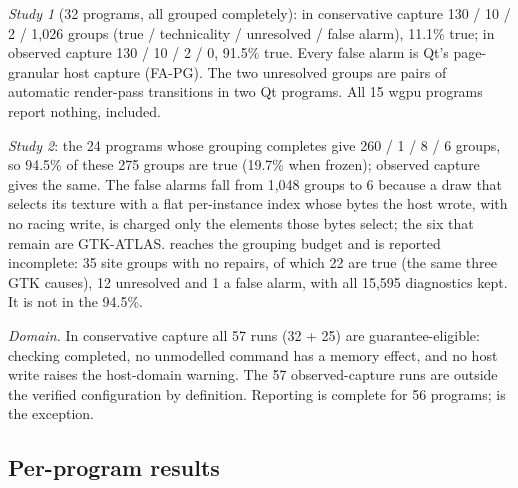 \emph{Study 1} (32 programs, all grouped completely): in conservative capture 130 / 10 / 2 / 1,026 groups (true /
technicality / unresolved / false alarm), 11.1\% true; in observed capture 130 / 10 / 2 / 0, 91.5\% true. Every false
alarm is Qt's page-granular host capture (FA-PG). The two unresolved groups are pairs of automatic render-pass
transitions in two Qt programs. All 15 wgpu programs report nothing,  included.

\emph{Study 2}: the 24 programs whose grouping completes give 260 / 1 / 8 / 6 groups, so 94.5\% of these 275 groups are
true (19.7\% when frozen); observed capture gives the same. The false alarms fall from 1,048 groups to 6 because a draw
that selects its texture with a flat per-instance index whose bytes the host wrote, with no racing write, is charged
only the elements those bytes select; the six that remain are GTK-ATLAS.  reaches the grouping
budget and is reported incomplete: 35 site groups with no repairs, of which 22 are true (the same three GTK causes), 12
unresolved and 1 a false alarm, with all 15,595 diagnostics kept. It is not in the 94.5\%.

\emph{Domain.} In conservative capture all 57 runs (32 + 25) are guarantee-eligible: checking completed, no
unmodelled command has a memory effect, and no host write raises the host-domain warning. The 57 observed-capture runs
are outside the verified configuration by definition. Reporting is complete for 56 programs; 
is the exception.

\subsection{Per-program results}
